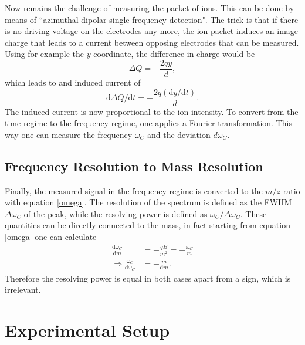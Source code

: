 \documentclass[a4paper,10pt]{article}
\begin{document}
Now remains the challenge of measuring the packet of ions. This can be done by means of ``azimuthal dipolar single-frequency detection". The trick is that if there is no driving voltage on the electrodes any more, the ion packet induces an image charge that leads to a current between opposing electrodes that can be measured. Using for example the $y$ coordinate, the difference in charge would be
\begin{equation*}
	\Delta Q = - \frac{2 q y }{d},
\end{equation*}
which leads to and induced current of
\begin{equation}
	\mathrm{d}\Delta Q / \mathrm{d}t = - \frac{2 q (\mathrm{d}y / \mathrm{d}t) }{d}.
\end{equation}
The induced current is now proportional to the ion intensity. To convert from the time regime to the frequency regime, one applies a Fourier transformation. This way one can measure the frequency $\omega_C$ and the deviation $d\omega_C$.

\subsection{Frequency Resolution to Mass Resolution}
Finally, the measured signal in the frequency regime is converted to the $m/z$-ratio with equation \eqref{omega}. The resolution of the spectrum is defined as the FWHM $\Delta \omega_C$ of the peak, while the resolving power is defined as $\omega_C / \Delta \omega_C$. These quantities can be directly connected to the mass, in fact starting from equation \eqref{omega} one can calculate
\begin{equation}
	\begin{split}
	\frac{\mathrm{d} \omega_C}{\mathrm{d} m} &= - \frac{q B}{m^2} = - \frac{\omega_C}{m}\\
	\Rightarrow \frac{\omega_C}{\mathrm{d} \omega_C} &= - \frac{m}{\mathrm{d}m}.
	\end{split}
\end{equation}
Therefore the resolving power is equal in both cases apart from a sign, which is irrelevant.


\section{Experimental Setup}
\end{document}
